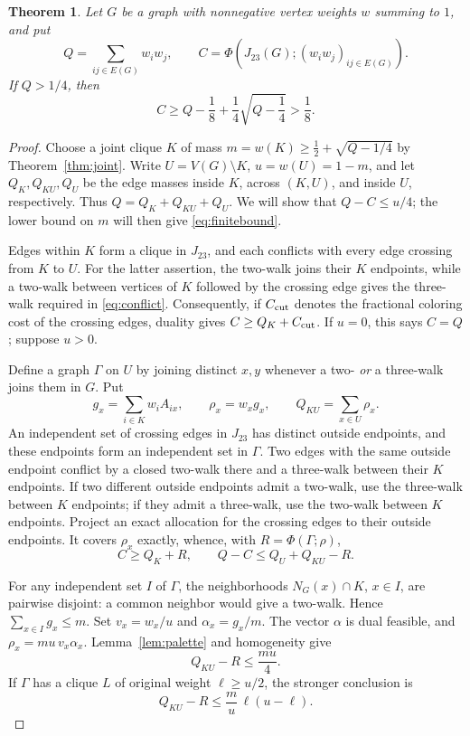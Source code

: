 \documentclass[10pt]{article}
\newtheorem{thm}{Theorem}[section]
\theoremstyle{remark}
\begin{document}
\begin{thm}\label{thm:finite}
Let $G$ be a graph with nonnegative vertex weights $w$ summing to $1$, and put
\[
 Q=\sum_{ij\in E(G)}w_iw_j,\qquad C=\Phi(J_{23}(G);(w_iw_j)_{ij\in E(G)}).
\]
If $Q>1/4$, then
\begin{equation}\label{eq:finitebound}
 C\ge Q-\frac18+\frac14\sqrt{Q-\frac14}>\frac18.
\end{equation}
\end{thm}
\begin{proof}
Choose a joint clique $K$ of mass $m=w(K)\ge\frac12+\sqrt{Q-1/4}$ by Theorem~\ref{thm:joint}. Write $U=V(G)\setminus K$, $u=w(U)=1-m$, and let $Q_K,Q_{KU},Q_U$ be the edge masses inside $K$, across $(K,U)$, and inside $U$, respectively. Thus $Q=Q_K+Q_{KU}+Q_U$. We will show that $Q-C\le u/4$; the lower bound on $m$ will then give \eqref{eq:finitebound}.

Edges within $K$ form a clique in $J_{23}$, and each conflicts with every edge crossing from $K$ to $U$. For the latter assertion, the two-walk joins their $K$ endpoints, while a two-walk between vertices of $K$ followed by the crossing edge gives the three-walk required in \eqref{eq:conflict}. Consequently, if $C_{\rm cut}$ denotes the fractional coloring cost of the crossing edges, duality gives $C\ge Q_K+C_{\rm cut}$. If $u=0$, this says $C=Q$; suppose $u>0$.

Define a graph $\Gamma$ on $U$ by joining distinct $x,y$ whenever a two- \emph{or} a three-walk joins them in $G$. Put
\[
 g_x=\sum_{i\in K}w_iA_{ix},\qquad \rho_x=w_xg_x,
 \qquad Q_{KU}=\sum_{x\in U}\rho_x.
\]
An independent set of crossing edges in $J_{23}$ has distinct outside endpoints, and these endpoints form an independent set in $\Gamma$. Two edges with the same outside endpoint conflict by a closed two-walk there and a three-walk between their $K$ endpoints. If two different outside endpoints admit a two-walk, use the three-walk between $K$ endpoints; if they admit a three-walk, use the two-walk between $K$ endpoints. Project an exact allocation for the crossing edges to their outside endpoints. It covers $\rho_x$ exactly, whence, with $R=\Phi(\Gamma;\rho)$,
\begin{equation}\label{eq:cutreduction}
 C\ge Q_K+R,\qquad Q-C\le Q_U+Q_{KU}-R.
\end{equation}

For any independent set $I$ of $\Gamma$, the neighborhoods $N_G(x)\cap K$, $x\in I$, are pairwise disjoint: a common neighbor would give a two-walk. Hence $\sum_{x\in I}g_x\le m$. Set $v_x=w_x/u$ and $\alpha_x=g_x/m$. The vector $\alpha$ is dual feasible, and $\rho_x=mu\,v_x\alpha_x$. Lemma~\ref{lem:palette} and homogeneity give
\begin{equation}\label{eq:crosssave}
 Q_{KU}-R\le\frac{mu}{4}.
\end{equation}
If $\Gamma$ has a clique $L$ of original weight $\ell\ge u/2$, the stronger conclusion is
\begin{equation}\label{eq:crosssaveclique}
 Q_{KU}-R\le\frac m u\,\ell(u-\ell).
\end{equation}


\end{proof}
\end{document}
